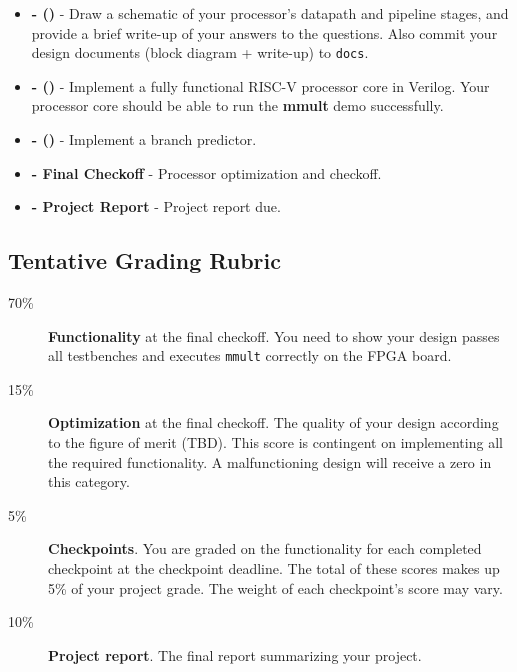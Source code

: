 \begin{minipage}{\textwidth}
\vspace{2mm}
\begin{itemize}
\item \textbf{\blockDiagramDueDate \space - \blockDiagramTaskName \space (\blockDiagramTimeAlloted)} -
  Draw a schematic of your processor's datapath and pipeline stages,
  and provide a brief write-up of your answers to the questions.
  Also commit your design documents (block diagram + write-up) to \verb|docs|.

\item \textbf{\baseCPUDueDate \space - \baseCPUTaskName \space (\baseCPUTimeAlloted)} -
  Implement a fully functional RISC-V processor core in Verilog.
  Your processor core should be able to run the \textbf{mmult} demo successfully.

\item \textbf{\branchPredictorDueDate \space - \branchPredictorTaskName \space (\branchPredictorTimeAlloted)} -
  Implement a branch predictor.
  
\item \textbf{\finalCheckoffDueDate \space - Final Checkoff} -
  Processor optimization and checkoff.
    
\item \textbf{\finalReportDueDate \space - Project Report} -
  Project report due.
\end{itemize}
\vspace{2mm}
\end{minipage}


\clearpage
\subsection{Tentative Grading Rubric}
\begin{framed}
\begin{description}
\item[70\%] {\bf Functionality} at the final checkoff.
  You need to show your design passes all testbenches
  and executes \verb|mmult| correctly on the FPGA board.
\item[15\%] {\bf Optimization} at the final checkoff.
  The quality of your design according to the figure of merit (TBD).
  This score is contingent on implementing all the required functionality.
  A malfunctioning design will receive a zero in this category.
\item[5\%] {\bf Checkpoints}.
  You are graded on the functionality for each completed checkpoint at the checkpoint deadline.
  The total of these scores makes up 5\% of your project grade.
  The weight of each checkpoint's score may vary.
\item[10\%] {\bf Project report}.
  The final report summarizing your project.
\end{description}
\end{framed}


